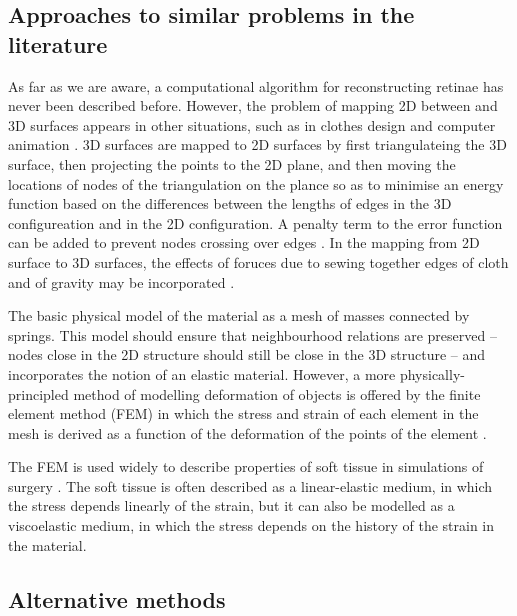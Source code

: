 \documentclass{article}
\begin{document}
\subsection{Approaches to similar problems in the literature}
\label{fold-sphere:sec:appr-simil-probl}

As far as we are aware, a computational algorithm for reconstructing
retinae has never been described before. However, the problem of
mapping 2D between and 3D surfaces appears in other situations, such
as in clothes design and computer animation
\citep{FanEtal98spri,MaCaEtal99flat,WangEtal02surf}. 3D surfaces are
mapped to 2D surfaces by first triangulateing the 3D surface, then
projecting the points to the 2D plane, and then moving the locations
of nodes of the triangulation on the plance so as to minimise an
energy function based on the differences between the lengths of edges
in the 3D configureation and in the 2D configuration. A penalty term
to the error function can be added to prevent nodes crossing over
edges \citep{WangEtal02surf}. In the mapping from 2D surface to 3D
surfaces, the effects of foruces due to sewing together edges of cloth
and of gravity may be incorporated \citep{FanEtal98spri}.

The basic physical model of the material as a mesh of masses connected
by springs. This model should ensure that neighbourhood relations are
preserved -- nodes close in the 2D structure should still be close in
the 3D structure -- and incorporates the notion of an elastic
material. However, a more physically-principled method of modelling
deformation of objects is offered by the finite element method (FEM)
in which the stress and strain of each element in the mesh is derived
as a function of the deformation of the points of the element
\citep{ZienTayl00fini}.

The FEM is used widely to describe properties of soft tissue in
simulations of surgery \citep{CartEtal05appl}. The soft tissue is
often described as a linear-elastic medium, in which the stress
depends linearly of the strain, but it can also be modelled as a
viscoelastic medium, in which the stress depends on the history of the
strain in the material. 


\subsection{Alternative methods}
\label{fold-sphere:sec:alternative-methods}
\end{document}

